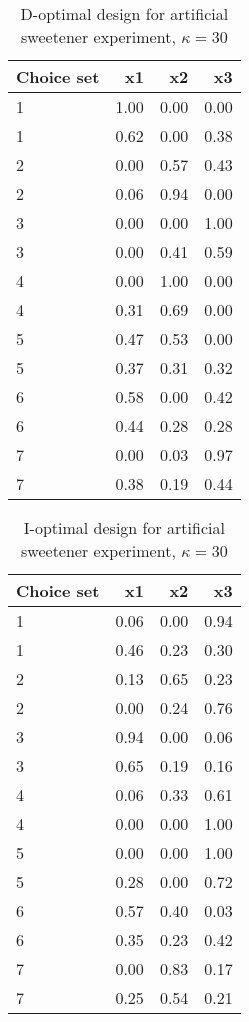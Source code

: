 \begin{table}[ht]
\centering
\begin{tabular}{lrrr}
  \hline
Choice set & x1 & x2 & x3 \\ 
  \hline
1 & 1.00 & 0.00 & 0.00 \\ 
  1 & 0.62 & 0.00 & 0.38 \\ 
  2 & 0.00 & 0.57 & 0.43 \\ 
  2 & 0.06 & 0.94 & 0.00 \\ 
  3 & 0.00 & 0.00 & 1.00 \\ 
  3 & 0.00 & 0.41 & 0.59 \\ 
  4 & 0.00 & 1.00 & 0.00 \\ 
  4 & 0.31 & 0.69 & 0.00 \\ 
  5 & 0.47 & 0.53 & 0.00 \\ 
  5 & 0.37 & 0.31 & 0.32 \\ 
  6 & 0.58 & 0.00 & 0.42 \\ 
  6 & 0.44 & 0.28 & 0.28 \\ 
  7 & 0.00 & 0.03 & 0.97 \\ 
  7 & 0.38 & 0.19 & 0.44 \\ 
   \hline
\end{tabular}
\caption{D-optimal design for artificial sweetener experiment, $\kappa = 30$} 
\label{tab:cornell_exp_d_optimal_des_kappa_30}
\end{table}
\begin{table}[ht]
\centering
\begin{tabular}{lrrr}
  \hline
Choice set & x1 & x2 & x3 \\ 
  \hline
1 & 0.06 & 0.00 & 0.94 \\ 
  1 & 0.46 & 0.23 & 0.30 \\ 
  2 & 0.13 & 0.65 & 0.23 \\ 
  2 & 0.00 & 0.24 & 0.76 \\ 
  3 & 0.94 & 0.00 & 0.06 \\ 
  3 & 0.65 & 0.19 & 0.16 \\ 
  4 & 0.06 & 0.33 & 0.61 \\ 
  4 & 0.00 & 0.00 & 1.00 \\ 
  5 & 0.00 & 0.00 & 1.00 \\ 
  5 & 0.28 & 0.00 & 0.72 \\ 
  6 & 0.57 & 0.40 & 0.03 \\ 
  6 & 0.35 & 0.23 & 0.42 \\ 
  7 & 0.00 & 0.83 & 0.17 \\ 
  7 & 0.25 & 0.54 & 0.21 \\ 
   \hline
\end{tabular}
\caption{I-optimal design for artificial sweetener experiment, $\kappa = 30$} 
\label{tab:cornell_exp_i_optimal_des_kappa_30}
\end{table}
